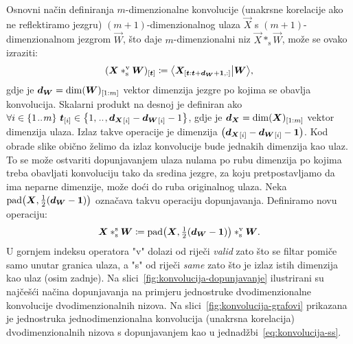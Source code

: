 \documentclass[utf8, diplomski, lmodern]{fer}
\begin{document}
Osnovni način definiranja $m$-dimenzionalne konvolucije (unakrsne korelacije ako ne reflektiramo jezgru) $(m+1)$-dimenzionalnog ulaza $\vec X$ s $(m+1)$-dimenzionalnom jezgrom $\vec W$, što daje $m$-dimenzionalni niz $\vec X*_\text{s}\vec W$, može se ovako izraziti:
\begin{align} \label{eq:konvolucija-sv}
(\vec X*_\text{s}^\text{v}\vec W)_\ind{\vec t} \coloneqq 
\braket{\vec X_\ind{\vec t:\vec t+ \vec d_{\vec W}+\cvec 1,:}}{\vec W} \text{,}
\end{align}
gdje je $\vec d_{\vec W} = \dim(\vec W)_\ind{1:m}$ vektor dimenzija jezgre po kojima se obavlja konvolucija. Skalarni produkt na desnoj je definiran ako $\forall i \in \cbr{1\bidot m}\ {\vec t}_\ind{i} \in \cbr{1,\bidot,{\vec d_{\vec X}}_\ind{i}-{\vec d_{\vec W}}_\ind{i}-1}$, gdje je $\vec d_{\vec X}=\dim(\vec X)_\ind{1:m}$ vektor dimenzija ulaza. Izlaz takve operacije je dimenzija $\del{{\vec d_{\vec X}}_\ind{i}-{\vec d_{\vec W}}_\ind{i}-\cvec 1}$.
Kod obrade slike obično želimo da izlaz konvolucije bude jednakih dimenzija kao ulaz. To se može ostvariti dopunjavanjem ulaza nulama po rubu dimenzija po kojima treba obavljati konvoluciju tako da sredina jezgre, za koju pretpostavljamo da ima neparne dimenzije, može doći do ruba originalnog ulaza. Neka $\mathrm{pad}\del{\vec X, \tfrac{1}{2}\del{\vec d_{\vec W}-\cvec 1}}$ označava takvu operaciju dopunjavanja. Definiramo novu operaciju:
\begin{align} \label{eq:konvolucija-ss}
\vec X *_\text{s}^\text{s} \vec W \coloneqq 
\mathrm{pad}\del{\vec X, \tfrac{1}{2}\del{\vec d_{\vec W}-\cvec 1}} *_\text{s}^\text{v} \vec W \text{.}
\end{align}
U gornjem indeksu operatora "v" dolazi od riječi \textit{valid} zato što se filtar pomiče samo unutar granica ulaza, a "s" od riječi \textit{same} zato što je izlaz istih dimenzija kao ulaz (osim zadnje). Na slici~\ref{fig:konvolucija-dopunjavanje} ilustrirani su najčešći načina dopunjavanja na primjeru jednostruke dvodimenzionalne konvolucije dvodimenzionalnih nizova. Na slici~\ref{fig:konvolucija-grafovi} prikazana je jednostruka jednodimenzionalna konvolucija (unakrsna korelacija) dvodimenzionalnih nizova s dopunjavanjem kao u jednadžbi~\eqref{eq:konvolucija-ss}. 
\end{document}
